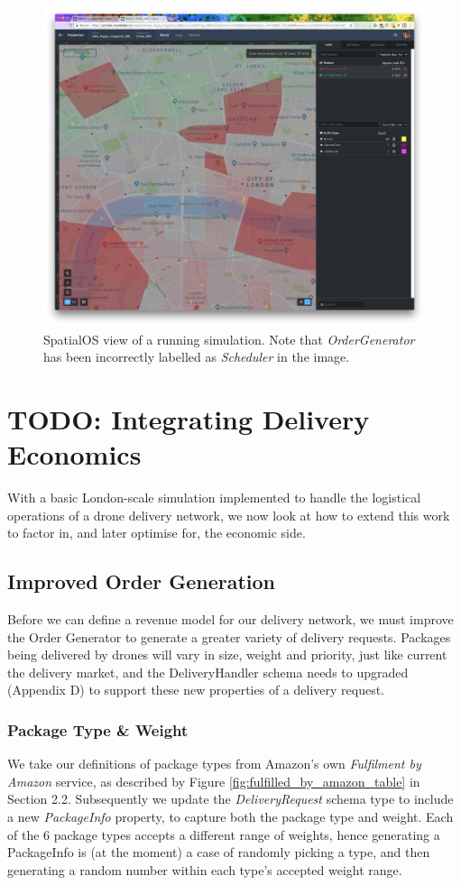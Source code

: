 \documentclass[a4paper,12pt,titlepage]{article}
\begin{document}
\begin{figure}[!hbpt]
  \center
  \includegraphics[width=0.95\linewidth]{img/gdoc2.png}
  \caption{SpatialOS view of a running simulation. Note that \textit{OrderGenerator} has been incorrectly labelled as \textit{Scheduler} in the image.}
  \label{fig:gdoc2}
\end{figure}

\newpage
\section{TODO: Integrating Delivery Economics}
With a basic London-scale simulation implemented to handle the logistical operations of a drone delivery network, we now look at how to extend this work to factor in, and later optimise for, the economic side.

\subsection{Improved Order Generation}
Before we can define a revenue model for our delivery network, we must improve the Order Generator to generate a greater variety of delivery requests. Packages being delivered by drones will vary in size, weight and priority, just like current the delivery market, and the DeliveryHandler schema needs to upgraded (Appendix D) to support these new properties of a delivery request.

\subsubsection{Package Type \& Weight}
We take our definitions of package types from Amazon's own \textit{Fulfilment by Amazon} service, as described by Figure \ref{fig:fulfilled_by_amazon_table} in Section 2.2. Subsequently we update the \textit{DeliveryRequest} schema type to include a new \textit{PackageInfo} property, to capture both the package type and weight. Each of the 6 package types accepts a different range of weights, hence generating a PackageInfo is (at the moment) a case of randomly picking a type, and then generating a random number within each type's accepted weight range.
\end{document}
